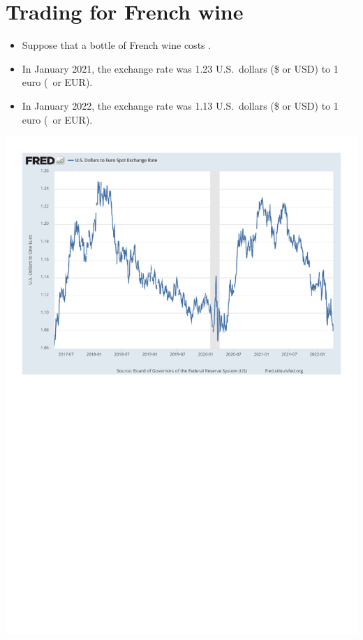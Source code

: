 \documentclass{assignment}
\begin{document}
\vspace{-2.0\baselineskip}

\clearpage

\section{Trading for French wine}

\begin{itemize}
\item Suppose that a bottle of French wine costs .
\item In January 2021, the exchange rate was 1.23 U.S.~dollars (\$ or USD) to 1 euro (\texteuro\, or EUR).
\item In January 2022, the exchange rate was 1.13 U.S.~dollars (\$ or USD) to 1 euro (\texteuro\, or EUR).
\end{itemize}

\vfill

\includegraphics[trim=1cm 15.5cm 1cm 1cm,clip,width=6.5in]{figures/fred_usd_eur.pdf}
\end{document}
